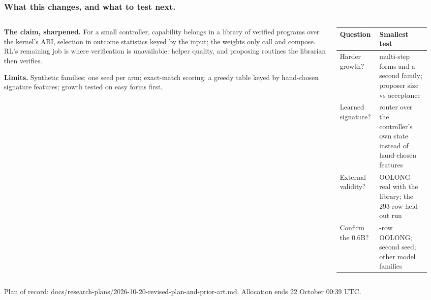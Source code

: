 \documentclass[aspectratio=169,11pt]{beamer}
\newcommand{\source}[1]{\vfill{\scriptsize\color{Gray}#1\par}}
\begin{document}
\begin{frame}[t]
\frametitle{What this changes, and what to test next.}
\begin{columns}[T,onlytextwidth]
\begin{column}{.48\textwidth}
\small
\textbf{The claim, sharpened.} For a small controller, capability belongs in a library of verified
programs over the kernel's ABI, selection in outcome statistics keyed by the input; the weights
only call and compose. RL's remaining job is where verification is unavailable: helper quality,
and proposing routines the librarian then verifies.
\medskip

\textbf{Limits.} Synthetic families; one seed per arm; exact-match scoring; a greedy table keyed
by hand-chosen signature features; growth tested on easy forms first.
\end{column}
\begin{column}{.48\textwidth}
\small
\begin{tabular}{@{}>{\raggedright\arraybackslash}p{.4\linewidth}>{\raggedright\arraybackslash}p{.56\linewidth}@{}}
\toprule
Question & Smallest test \\
\midrule
Harder growth? & multi-step forms and a second family; proposer size vs acceptance \\[1mm]
Learned signature? & router over the controller's own state instead of hand-chosen features \\[1mm]
External validity? & OOLONG-real with the library; the 293-row held-out run \\[1mm]
Confirm the 0.6B? & 293-row OOLONG; second seed; other model families \\
\bottomrule
\end{tabular}
\end{column}
\end{columns}
\source{Plan of record: docs/research-plans/2026-10-20-revised-plan-and-prior-art.md. Allocation ends 22 October 00:39 UTC.}
\end{frame}
\end{document}
